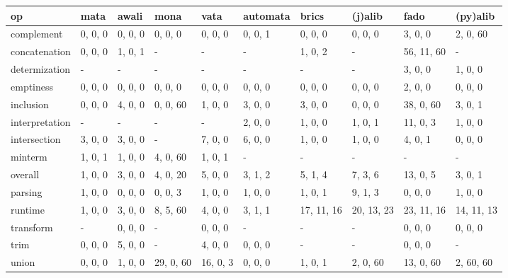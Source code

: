 \begin{tabular}{llllllllll}
\hline
 op             & mata    & awali   & mona      & vata     & automata   & brics      & (j)alib    & fado       & (py)alib   \\
\hline
 complement     & 0, 0, 0 & 0, 0, 0 & 0, 0, 0   & 0, 0, 0  & 0, 0, 1    & 0, 0, 0    & 0, 0, 0    & 3, 0, 0    & 2, 0, 60   \\
 concatenation  & 0, 0, 0 & 1, 0, 1 & -         & -        & -          & 1, 0, 2    & -          & 56, 11, 60 & -          \\
 determization  & -       & -       & -         & -        & -          & -          & -          & 3, 0, 0    & 1, 0, 0    \\
 emptiness      & 0, 0, 0 & 0, 0, 0 & 0, 0, 0   & 0, 0, 0  & 0, 0, 0    & 0, 0, 0    & 0, 0, 0    & 2, 0, 0    & 0, 0, 0    \\
 inclusion      & 0, 0, 0 & 4, 0, 0 & 0, 0, 60  & 1, 0, 0  & 3, 0, 0    & 3, 0, 0    & 0, 0, 0    & 38, 0, 60  & 3, 0, 1    \\
 interpretation & -       & -       & -         & -        & 2, 0, 0    & 1, 0, 0    & 1, 0, 1    & 11, 0, 3   & 1, 0, 0    \\
 intersection   & 3, 0, 0 & 3, 0, 0 & -         & 7, 0, 0  & 6, 0, 0    & 1, 0, 0    & 1, 0, 0    & 4, 0, 1    & 0, 0, 0    \\
 minterm        & 1, 0, 1 & 1, 0, 0 & 4, 0, 60  & 1, 0, 1  & -          & -          & -          & -          & -          \\
 overall        & 1, 0, 0 & 3, 0, 0 & 4, 0, 20  & 5, 0, 0  & 3, 1, 2    & 5, 1, 4    & 7, 3, 6    & 13, 0, 5   & 3, 0, 1    \\
 parsing        & 1, 0, 0 & 0, 0, 0 & 0, 0, 3   & 1, 0, 0  & 1, 0, 0    & 1, 0, 1    & 9, 1, 3    & 0, 0, 0    & 1, 0, 0    \\
 runtime        & 1, 0, 0 & 3, 0, 0 & 8, 5, 60  & 4, 0, 0  & 3, 1, 1    & 17, 11, 16 & 20, 13, 23 & 23, 11, 16 & 14, 11, 13 \\
 transform      & -       & 0, 0, 0 & -         & 0, 0, 0  & -          & -          & -          & 0, 0, 0    & 0, 0, 0    \\
 trim           & 0, 0, 0 & 5, 0, 0 & -         & 4, 0, 0  & 0, 0, 0    & -          & -          & 0, 0, 0    & -          \\
 union          & 0, 0, 0 & 1, 0, 0 & 29, 0, 60 & 16, 0, 3 & 0, 0, 0    & 1, 0, 1    & 2, 0, 60   & 13, 0, 60  & 2, 60, 60  \\
\hline
\end{tabular}